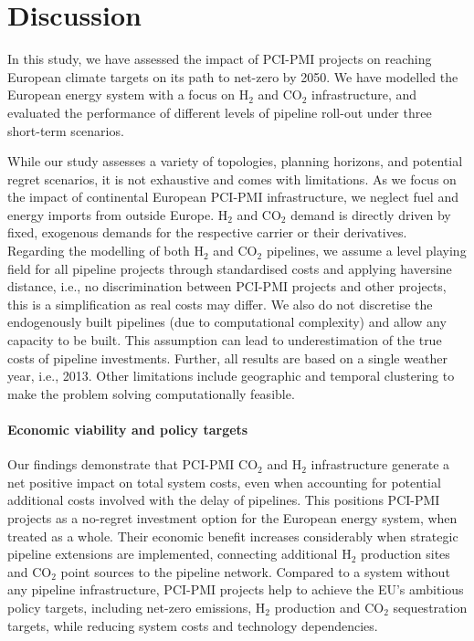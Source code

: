 \documentclass[pdflatex,sn-nature]{sn-jnl}%
\theoremstyle{thmstyleone}%
\theoremstyle{thmstyletwo}%
\theoremstyle{thmstylethree}%
\begin{document}
\section*{Discussion}
\label{sec:discussion}

In this study, we have assessed the impact of PCI-PMI projects on reaching European climate targets on its path to net-zero by 2050. We have modelled the European energy system with a focus on H$_2$ and CO$_2$ infrastructure, and evaluated the performance of different levels of pipeline roll-out under three short-term scenarios. 

While our study assesses a variety of topologies, planning horizons, and potential regret scenarios, it is not exhaustive and comes with limitations. As we focus on the impact of continental European PCI-PMI infrastructure, we neglect fuel and energy imports from outside Europe. H$_2$ and CO$_2$ demand is directly driven by fixed, exogenous demands for the respective carrier or their derivatives. Regarding the modelling of both H$_2$ and CO$_2$ pipelines, we assume a level playing field for all pipeline projects through standardised costs and applying haversine distance, i.e., no discrimination between PCI-PMI projects and other projects, this is a simplification as real costs may differ. We also do not discretise the endogenously built pipelines (due to computational complexity) and allow any capacity to be built. This assumption can lead to underestimation of the true costs of pipeline investments.
Further, all results are based on a single weather year, i.e., 2013.
Other limitations include geographic and temporal clustering to make the problem solving computationally feasible.


\paragraph{Economic viability and policy targets}
Our findings demonstrate that PCI-PMI CO$_2$ and H$_2$ infrastructure generate a net positive impact on total system costs, even when accounting for potential additional costs involved with the delay of pipelines. This positions PCI-PMI projects as a no-regret investment option for the European energy system, when treated as a whole.
Their economic benefit increases considerably when strategic pipeline extensions are implemented, connecting additional H$_2$ production sites and CO$_2$ point sources to the pipeline network. 
Compared to a system without any pipeline infrastructure, PCI-PMI projects help to achieve the EU's ambitious policy targets, including net-zero emissions, H$_2$ production and CO$_2$ sequestration targets, while reducing system costs and technology dependencies.
\end{document}
